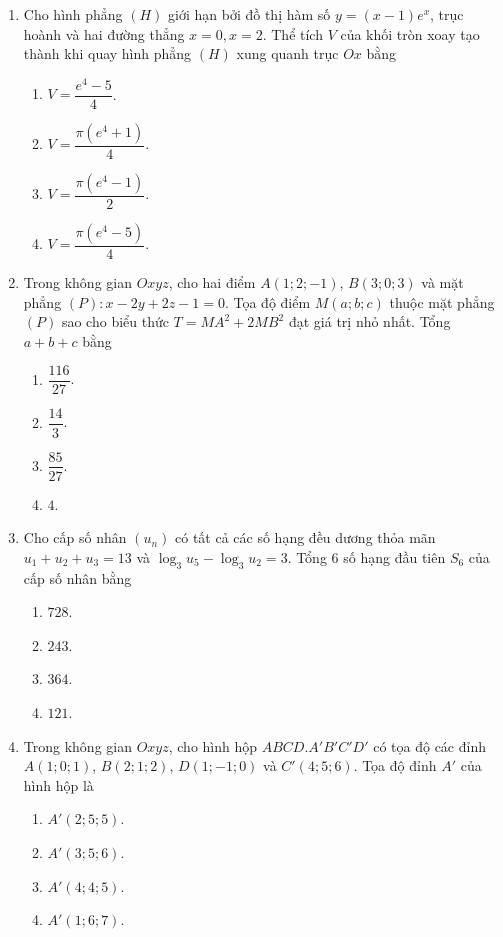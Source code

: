 \documentclass[12pt,a4paper]{article}
\begin{document}
\begin{enumerate}[label=\textbf{Câu \arabic*:}, leftmargin=*]
\item Cho hình phẳng $(H)$ giới hạn bởi đồ thị hàm số $y = (x-1)e^x$, trục hoành và hai đường thẳng $x = 0, x = 2$. Thể tích $V$ của khối tròn xoay tạo thành khi quay hình phẳng $(H)$ xung quanh trục $Ox$ bằng
\begin{enumerate}[label=\Alph*.]
    \item $V = \dfrac{e^4 - 5}{4}$.
    \item $V = \dfrac{\pi(e^4 + 1)}{4}$.
    \item $V = \dfrac{\pi(e^4 - 1)}{2}$.
    \item $V = \dfrac{\pi(e^4 - 5)}{4}$.
\end{enumerate}

\item Trong không gian $Oxyz$, cho hai điểm $A(1; 2; -1)$, $B(3; 0; 3)$ và mặt phẳng $(P): x - 2y + 2z - 1 = 0$. Tọa độ điểm $M(a; b; c)$ thuộc mặt phẳng $(P)$ sao cho biểu thức $T = MA^2 + 2MB^2$ đạt giá trị nhỏ nhất. Tổng $a + b + c$ bằng
\begin{enumerate}[label=\Alph*.]
    \item $\dfrac{116}{27}$.
    \item $\dfrac{14}{3}$.
    \item $\dfrac{85}{27}$.
    \item $4$.
\end{enumerate}

\item Cho cấp số nhân $(u_n)$ có tất cả các số hạng đều dương thỏa mãn $u_1 + u_2 + u_3 = 13$ và $\log_3 u_5 - \log_3 u_2 = 3$. Tổng $6$ số hạng đầu tiên $S_6$ của cấp số nhân bằng
\begin{enumerate}[label=\Alph*.]
    \item $728$.
    \item $243$.
    \item $364$.
    \item $121$.
\end{enumerate}

\item Trong không gian $Oxyz$, cho hình hộp $ABCD.A'B'C'D'$ có tọa độ các đỉnh $A(1; 0; 1)$, $B(2; 1; 2)$, $D(1; -1; 0)$ và $C'(4; 5; 6)$. Tọa độ đỉnh $A'$ của hình hộp là
\begin{enumerate}[label=\Alph*.]
    \item $A'(2; 5; 5)$.
    \item $A'(3; 5; 6)$.
    \item $A'(4; 4; 5)$.
    \item $A'(1; 6; 7)$.
\end{enumerate}


\end{enumerate}
\end{document}
